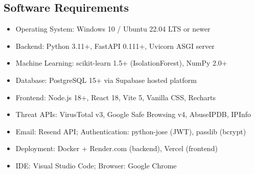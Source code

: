 \subsection*{Software Requirements}
\begin{itemize}
    \item Operating System: Windows 10 / Ubuntu 22.04 LTS or newer
    \item Backend: Python 3.11+, FastAPI 0.111+, Uvicorn ASGI server
    \item Machine Learning: scikit-learn 1.5+ (IsolationForest), NumPy 2.0+
    \item Database: PostgreSQL 15+ via Supabase hosted platform
    \item Frontend: Node.js 18+, React 18, Vite 5, Vanilla CSS, Recharts
    \item Threat APIs: VirusTotal v3, Google Safe Browsing v4, AbuseIPDB, IPInfo
    \item Email: Resend API; Authentication: python-jose (JWT), passlib (bcrypt)
    \item Deployment: Docker + Render.com (backend), Vercel (frontend)
    \item IDE: Visual Studio Code; Browser: Google Chrome
\end{itemize}
